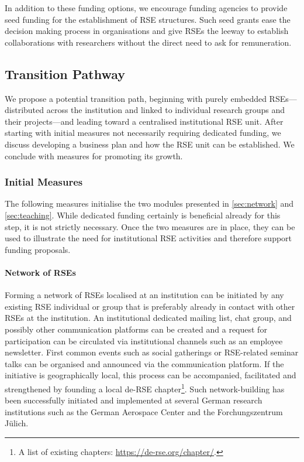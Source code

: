 \documentclass[10pt,letterpaper]{article}
\begin{document}
In addition to these funding options, we encourage funding agencies to provide seed funding for the establishment of RSE structures.
Such seed grants ease the decision making process in organisations and give RSEs the leeway to establish collaborations with researchers without the direct need to ask for remuneration.

\subsection*{Transition Pathway}

We propose a potential transition path, beginning with purely embedded RSEs---distributed across the institution and linked to individual research groups and their projects---and leading toward a centralised institutional RSE unit.
After starting with initial measures not necessarily requiring dedicated funding, we discuss developing a business plan and how the RSE unit can be established.
We conclude with measures for promoting its growth.

\subsubsection*{Initial Measures}
The following measures initialise the two modules presented in \autoref{sec:network} and \autoref{sec:teaching}.
While dedicated funding certainly is beneficial already for this step, it is not strictly necessary.
Once the two measures are in place, they can be used to illustrate the need for institutional RSE activities and therefore support funding proposals.

\paragraph{Network of RSEs}
Forming a network of RSEs localised at an institution can be initiated by any existing RSE individual or group that is preferably already in contact with other RSEs at the institution.
An institutional dedicated mailing list, chat group, and possibly other communication platforms can be created and a request for participation can be circulated via institutional channels such as an employee newsletter.
First common events such as social gatherings or RSE-related seminar talks can be organised and announced via the communication platform.
If the initiative is geographically local, this process can be accompanied, facilitated and strengthened by founding a local de-RSE chapter\footnote{A list of existing chapters: \url{https://de-rse.org/chapter/}.}.
Such network-building has been successfully initiated and implemented at several German research institutions such as the German Aerospace Center and the Forchungszentrum Jülich.
\end{document}

